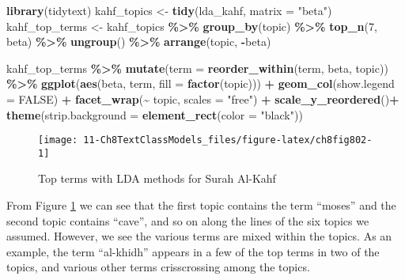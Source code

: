 \documentclass[
]{article}
\newenvironment{Shaded}{\begin{snugshade}}{\end{snugshade}}
\newcommand{\AttributeTok}[1]{\textcolor[rgb]{0.13,0.29,0.53}{#1}}
\newcommand{\ConstantTok}[1]{\textcolor[rgb]{0.56,0.35,0.01}{#1}}
\newcommand{\DecValTok}[1]{\textcolor[rgb]{0.00,0.00,0.81}{#1}}
\newcommand{\FunctionTok}[1]{\textcolor[rgb]{0.13,0.29,0.53}{\textbf{#1}}}
\newcommand{\NormalTok}[1]{#1}
\newcommand{\OtherTok}[1]{\textcolor[rgb]{0.56,0.35,0.01}{#1}}
\newcommand{\SpecialCharTok}[1]{\textcolor[rgb]{0.81,0.36,0.00}{\textbf{#1}}}
\newcommand{\StringTok}[1]{\textcolor[rgb]{0.31,0.60,0.02}{#1}}
\begin{document}
\begin{Shaded}
\begin{Highlighting}[]
\FunctionTok{library}\NormalTok{(tidytext)}
\NormalTok{kahf\_topics }\OtherTok{\textless{}{-}} \FunctionTok{tidy}\NormalTok{(lda\_kahf, }\AttributeTok{matrix =} \StringTok{"beta"}\NormalTok{)}
\NormalTok{kahf\_top\_terms }\OtherTok{\textless{}{-}}\NormalTok{ kahf\_topics }\SpecialCharTok{\%\textgreater{}\%}
  \FunctionTok{group\_by}\NormalTok{(topic) }\SpecialCharTok{\%\textgreater{}\%}
  \FunctionTok{top\_n}\NormalTok{(}\DecValTok{7}\NormalTok{, beta) }\SpecialCharTok{\%\textgreater{}\%}
  \FunctionTok{ungroup}\NormalTok{() }\SpecialCharTok{\%\textgreater{}\%}
  \FunctionTok{arrange}\NormalTok{(topic, }\SpecialCharTok{{-}}\NormalTok{beta)}

\NormalTok{kahf\_top\_terms }\SpecialCharTok{\%\textgreater{}\%}
  \FunctionTok{mutate}\NormalTok{(}\AttributeTok{term =} \FunctionTok{reorder\_within}\NormalTok{(term, beta, topic)) }\SpecialCharTok{\%\textgreater{}\%}
  \FunctionTok{ggplot}\NormalTok{(}\FunctionTok{aes}\NormalTok{(beta, term, }\AttributeTok{fill =} \FunctionTok{factor}\NormalTok{(topic))) }\SpecialCharTok{+}
  \FunctionTok{geom\_col}\NormalTok{(}\AttributeTok{show.legend =} \ConstantTok{FALSE}\NormalTok{) }\SpecialCharTok{+}
  \FunctionTok{facet\_wrap}\NormalTok{(}\SpecialCharTok{\textasciitilde{}}\NormalTok{ topic, }\AttributeTok{scales =} \StringTok{"free"}\NormalTok{) }\SpecialCharTok{+}
  \FunctionTok{scale\_y\_reordered}\NormalTok{()}\SpecialCharTok{+}
  \FunctionTok{theme}\NormalTok{(}\AttributeTok{strip.background =} \FunctionTok{element\_rect}\NormalTok{(}\AttributeTok{color =} \StringTok{"black"}\NormalTok{))}
\end{Highlighting}
\end{Shaded}

\begin{figure}

{\centering \texttt{[image: 11-Ch8TextClassModels\_files/figure-latex/ch8fig802-1]} 

}

\caption{Top terms with LDA methods for Surah Al-Kahf}\label{fig:ch8fig802}
\end{figure}

From Figure \ref{fig:ch8fig802} we can see that the first topic contains the term ``moses'' and the second topic contains ``cave'', and so on along the lines of the six topics we assumed. However, we see the various terms are mixed within the topics. As an example, the term ``al-khidh'' appears in a few of the top terms in two of the topics, and various other terms crisscrossing among the topics.
\end{document}
